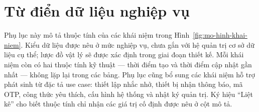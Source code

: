 \section{Từ điển dữ liệu nghiệp vụ}\label{pl:tu-dien}

Phụ lục này mô tả thuộc tính của các khái niệm trong Hình~\ref{fig:mo-hinh-khai-niem}. Kiểu dữ liệu được nêu ở mức nghiệp vụ, chưa gắn với hệ quản trị cơ sở dữ liệu cụ thể; lược đồ vật lý sẽ được xác định trong giai đoạn thiết kế. Mỗi khái niệm còn có hai thuộc tính kỹ thuật — thời điểm tạo và thời điểm cập nhật gần nhất — không lặp lại trong các bảng. Phụ lục cũng bổ sung các khái niệm hỗ trợ phát sinh từ đặc tả use case: thiết lập nhắc nhở, thiết bị nhận thông báo, mã OTP, công thức yêu thích, cấu hình hệ thống và nhật ký quản trị. Ký hiệu “Liệt kê” cho biết thuộc tính chỉ nhận các giá trị cố định được nêu ở cột mô tả.


